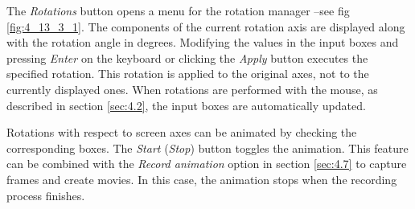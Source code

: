 \documentclass[10pt]{article}
\begin{document}
The {\it Rotations} button opens a menu for the rotation manager --see fig
\ref{fig:4_13_3_1}. The components of the current rotation axis are displayed along
with the rotation angle in degrees. Modifying the values in the input boxes and pressing {\it Enter} on the keyboard or clicking the
{\it Apply} button executes the specified rotation. This rotation is applied to the original axes, not to the currently displayed ones.
When rotations are performed with the mouse, as described in section \ref{sec:4.2},
the input boxes are automatically updated.

Rotations with respect to screen axes can be animated
by checking the corresponding
boxes. The {\it Start} ({\it Stop}) button toggles the animation. This feature can be 
combined with the {\it Record animation} 
option in section \ref{sec:4.7} to capture
frames and create movies. In this case, the animation stops when the recording process finishes.
\end{document}
